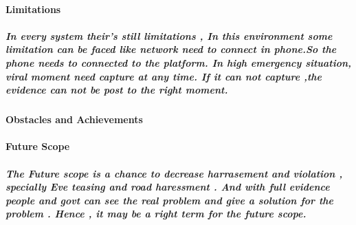 \documentclass{article}
\begin{document}
\paragraph{Limitations}
\subparagraph{In every system their's still limitations , In this environment some limitation can be faced like network need to connect in phone.So the phone needs to connected to the platform. In high emergency situation, viral moment need capture at any time. If it can not capture ,the evidence can not be post to the right moment.}
\paragraph{Obstacles and Achievements}

\paragraph{Future Scope}
\subparagraph{The Future scope is a chance to decrease harrasement and violation , specially Eve teasing and road haressment . And with full evidence people and govt can see the real problem and give a solution for the problem . Hence , it may be a right term for the future scope. }
\end{document}
